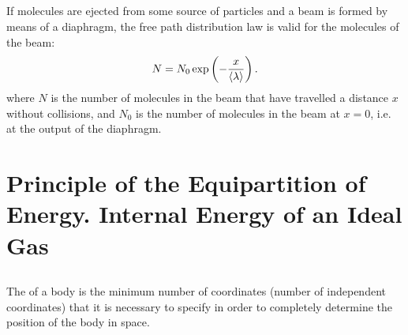 \subsection{}\label{10.5.4} If molecules are ejected from some source of particles and a beam is formed by means of a diaphragm, the free path distribution law is valid for the molecules of the beam:
\begin{equation*}%
N = N_{0} \exp \left( -\frac{x}{\expval{\lambda}}\right).
\end{equation*}
where $N$ is the number of molecules in the beam that have travelled a distance $x$ without collisions, and $N_{0}$ is the number of molecules in the beam at $x = 0$, i.e. at the output of the diaphragm.



\section[Equipartition of Energy]{Principle of the Equipartition of Energy. Internal Energy of an Ideal Gas}

\subsection{}\label{10.6.1} The  of a body is the minimum number of coordinates (number of independent coordinates) that it is necessary to specify in order to completely determine the position of the body in space.



